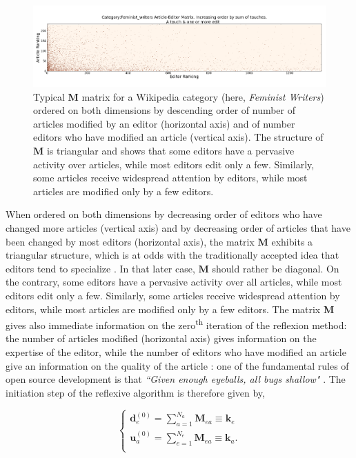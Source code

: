 \begin{figure}[!t]
\centering
\includegraphics[width=2.0\columnwidth]{Figures/Category_Feminist_writerstriangle_matrix_corrected.png}
\caption{Typical $\mathbf{M}$ matrix for a Wikipedia category (here, {\it Feminist Writers}) ordered on both dimensions by descending order of number of articles modified by an editor (horizontal axis) and of number editors who have modified an article (vertical axis). The structure of $\mathbf{M}$ is triangular and shows that some editors have a pervasive activity over articles, while most editors edit only a few. Similarly, some articles receive widespread attention by editors, while most articles are modified only by a few editors.}
\label{fig:triangle_matrix}
\end{figure}

When ordered on both dimensions by decreasing order of editors who have changed more articles (vertical axis) and by decreasing order of articles that have been changed by most editors (horizontal axis), the matrix $\mathbf{M}$ exhibits a triangular structure, which is at odds with the traditionally accepted idea that editors tend to specialize \cite{}. In that later case, $\mathbf{M}$ should rather be diagonal. On the contrary, some editors have a pervasive activity over all articles, while most editors edit only a few. Similarly, some articles receive widespread attention by editors, while most articles are modified only by a few editors. The matrix $\mathbf{M}$ gives also immediate information on the zero\textsuperscript{th} iteration of the reflexion method: the number of articles modified (horizontal axis) gives information on the expertise of the editor, while the number of editors who have modified an article give an information on the quality of the article : one of the fundamental rules of open source development is that {\it ``Given enough eyeballs, all bugs shallow"} \cite{raymond1999}. The initiation step of the reflexive algorithm is therefore given by,

\begin{equation}
\begin{cases}
 \mathbf{d}_{e}^{(0)} = \sum_{a=1}^{N_{a}} \mathbf{M}_{ea} \equiv \mathbf{k}_e\\
 \mathbf{u}_{a}^{(0)} = \sum_{e=1}^{N_{e}} \mathbf{M}_{ea} \equiv \mathbf{k}_a.\\
\end{cases}
\label{HHinit}
\end{equation}

